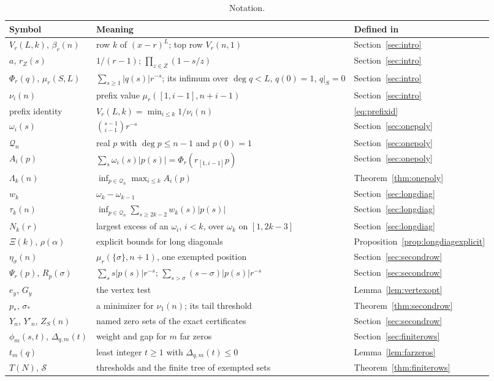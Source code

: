 \documentclass[11pt]{article}
\begin{document}
\begin{table}[tp]
\centering
\small
\renewcommand{\arraystretch}{1.15}
\begin{tabular}{@{}l p{} l@{}}
\hline
Symbol & Meaning & Defined in\\
\hline
$V_r(L,k)$, $\beta_r(n)$ & row $k$ of $(x-r)^L$; top row $V_r(n,1)$
  & Section~\ref{sec:intro}\\
$a$, $r_Z(s)$ & $1/(r-1)$; $\prod_{z\in Z}(1-s/z)$ & Section~\ref{sec:intro}\\
$\Phi_r(q)$, $\mu_r(S,L)$ & $\sum_{s\ge1}|q(s)|r^{-s}$; its infimum over
  $\deg q<L$, $q(0)=1$, $q|_S=0$ & Section~\ref{sec:intro}\\
$\nu_i(n)$ & prefix value $\mu_r([1,i-1],n+i-1)$ & Section~\ref{sec:intro}\\
prefix identity & $V_r(L,k)=\min_{i\le k}1/\nu_i(n)$ & \eqref{eq:prefixid}\\
$\omega_i(s)$ & $\binom{s-1}{i-1}r^{-s}$ & Section~\ref{sec:onepoly}\\
$\mathcal Q_n$ & real $p$ with $\deg p\le n-1$ and $p(0)=1$
  & Section~\ref{sec:onepoly}\\
$A_i(p)$ & $\sum_s\omega_i(s)|p(s)|=\Phi_r(r_{[1,i-1]}p)$
  & Section~\ref{sec:onepoly}\\
$\Lambda_k(n)$ & $\inf_{p\in\mathcal Q_n}\max_{i\le k}A_i(p)$
  & Theorem~\ref{thm:onepoly}\\
$w_k$ & $\omega_k-\omega_{k-1}$ & Section~\ref{sec:longdiag}\\
$\tau_k(n)$ & $\inf_{p\in\mathcal Q_n}\sum_{s\ge2k-2}w_k(s)|p(s)|$
  & Section~\ref{sec:longdiag}\\
$N_k(r)$ & largest excess of an $\omega_i$, $i<k$, over $\omega_k$ on
  $[1,2k-3]$ & Section~\ref{sec:longdiag}\\
$\Xi(k)$, $\rho(\alpha)$ & explicit bounds for long diagonals
  & Proposition~\ref{prop:longdiagexplicit}\\
$\eta_\sigma(n)$ & $\mu_r(\{\sigma\},n+1)$, one exempted position
  & Section~\ref{sec:secondrow}\\
$\Psi_r(p)$, $R_p(\sigma)$ & $\sum_ss|p(s)|r^{-s}$;
  $\sum_{s>\sigma}(s-\sigma)|p(s)|r^{-s}$ & Section~\ref{sec:secondrow}\\
$e_y$, $G_y$ & the vertex test & Lemma~\ref{lem:vertexopt}\\
$p_*$, $\sigma_*$ & a minimizer for $\nu_1(n)$; its tail threshold
  & Theorem~\ref{thm:secondrow}\\
$Y_n$, $Y'_n$, $Z_S(n)$ & named zero sets of the exact certificates
  & Section~\ref{sec:secondrow}\\
$\phi_m(s,t)$, $\Delta_{q,m}(t)$ & weight and gap for $m$ far zeros
  & Section~\ref{sec:finiterows}\\
$t_m(q)$ & least integer $t\ge1$ with $\Delta_{q,m}(t)\le0$
  & Lemma~\ref{lem:farzeros}\\
$T(N)$, $\mathcal S$ & thresholds and the finite tree of exempted sets
  & Theorem~\ref{thm:finiterows}\\
\hline
\end{tabular}
\caption{Notation.}\label{tab:notation}
\end{table}
\end{document}
